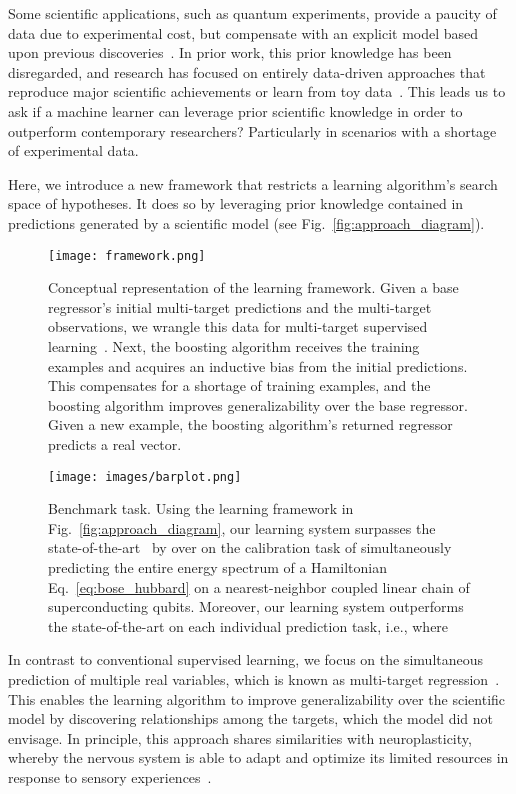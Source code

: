 \documentclass[aps,twocolumn,superscriptaddress,floatfix,preprintnumbers,showkeys]{revtex4}
\begin{document}
Some scientific applications, such as quantum experiments, provide a paucity of data due to experimental cost, but compensate with an explicit model based upon previous discoveries~\cite{Brunton_2016, Roushan_2017, Butler_2018, Neill_2018, Chiaro_2019}. In prior work, this prior knowledge has been disregarded, and research has focused on entirely data-driven approaches that reproduce major scientific achievements or learn from toy data~\cite{Schmidt_2009, Carrasquilla_2017, Melnikov_2018, Koch-Janusz_2018, Torlai_2018, Wu_2019, Iten_2020, Wetzel_2020}. This leads us to ask if a machine learner can leverage prior scientific knowledge in order to outperform contemporary researchers? Particularly in scenarios with a shortage of experimental data.

Here, we introduce a new framework that restricts a learning algorithm's search space of hypotheses. It does so by leveraging prior knowledge contained in predictions generated by a scientific model (see Fig.~\ref{fig:approach_diagram}). 
\begin{figure*}
\centering
\begin{minipage}{\columnwidth}
\centering
\texttt{[image: framework.png]}
\caption{Conceptual representation of the learning framework. Given a base regressor's initial multi-target predictions and the multi-target observations, we wrangle this data for multi-target supervised learning~\cite{Borchani_2015, Waegeman_2019}. Next, the boosting algorithm receives the training examples and acquires an inductive bias from the initial predictions. This compensates for a shortage of training examples, and the boosting algorithm improves generalizability over the base regressor. Given a new example, the boosting algorithm's returned regressor predicts a real vector.}
\label{fig:approach_diagram}
\end{minipage}\hfill
\begin{minipage}{\columnwidth}
\centering
\texttt{[image: images/barplot.png]} 
\caption{Benchmark task. Using the learning framework in Fig.~\ref{fig:approach_diagram}, our learning system surpasses the state-of-the-art~\cite{Roushan_2017, Neill_2018, Chiaro_2019} by over  on the calibration task of simultaneously predicting the entire energy spectrum of a Hamiltonian Eq.~\ref{eq:bose_hubbard} on a nearest-neighbor coupled linear chain of superconducting qubits. Moreover, our learning system outperforms the state-of-the-art on each individual prediction task, i.e.,  where }
\label{fig:test_data_mae}
\end{minipage}
\end{figure*}
In contrast to conventional supervised learning, we focus on the simultaneous prediction of multiple real variables, which is known as multi-target regression~\cite{Caruana_1997, Sklearn_2011, Borchani_2015, Waegeman_2019}. This enables the learning algorithm to improve generalizability over the scientific model by discovering relationships among the targets, which the model did not envisage. In principle, this approach shares similarities with neuroplasticity, whereby the nervous system is able to adapt and optimize its limited resources in response to sensory experiences~\cite{Pascual_leone_2005}. 
\end{document}
